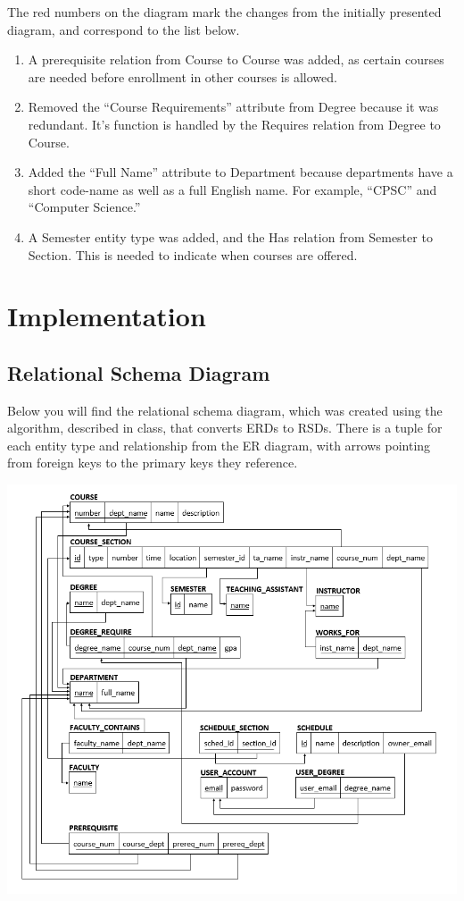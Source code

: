 \documentclass[twoside=false,a4paper,11pt]{article}
\theoremstyle{mytheor}
\begin{document}
The red numbers on the diagram mark the changes from the initially presented diagram, and correspond to the list below.

\begin{enumerate}
	\item A prerequisite relation from Course to Course was added, as certain courses are needed before enrollment in other courses is allowed.
	\item Removed the ``Course Requirements'' attribute from Degree because it was redundant. It's function is handled by the Requires relation from Degree to Course.
	\item Added the ``Full Name'' attribute to Department because departments have a short code-name as well as a full English name. For example, ``CPSC'' and ``Computer Science.''
	\item A Semester entity type was added, and the Has relation from Semester to Section.  This is needed to indicate when courses are offered.
\end{enumerate}

\section*{Implementation}

\subsection*{Relational Schema Diagram}

Below you will find the relational schema diagram, which was created using the algorithm, described in class, that converts ERDs to RSDs. There is a tuple for each entity type and relationship from the ER diagram, with arrows pointing from foreign keys to the primary keys they reference.

\includegraphics[width=\textwidth]{RelationalSchemaDiagram.png}
\end{document}
